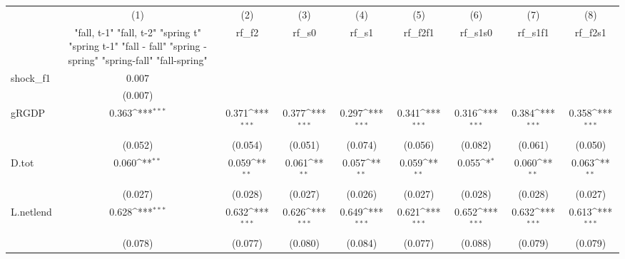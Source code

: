 {
\def\sym#1{\ifmmode^{#1}\else\(^{#1}\)\fi}
\begin{tabular}{l*{8}{c}}
\toprule
            &\multicolumn{1}{c}{(1)}&\multicolumn{1}{c}{(2)}&\multicolumn{1}{c}{(3)}&\multicolumn{1}{c}{(4)}&\multicolumn{1}{c}{(5)}&\multicolumn{1}{c}{(6)}&\multicolumn{1}{c}{(7)}&\multicolumn{1}{c}{(8)}\\
            &\multicolumn{1}{c}{  "fall, t-1" "fall, t-2" "spring t" "spring t-1"  "fall - fall" "spring - spring" "spring-fall" "fall-spring" }&\multicolumn{1}{c}{rf\_f2}&\multicolumn{1}{c}{rf\_s0}&\multicolumn{1}{c}{rf\_s1}&\multicolumn{1}{c}{rf\_f2f1}&\multicolumn{1}{c}{rf\_s1s0}&\multicolumn{1}{c}{rf\_s1f1}&\multicolumn{1}{c}{rf\_f2s1}\\
\midrule
shock\_f1    &       0.007         &                     &                     &                     &                     &                     &                     &                     \\
            &     (0.007)         &                     &                     &                     &                     &                     &                     &                     \\
\addlinespace
gRGDP       &       0.363\sym{***}&       0.371\sym{***}&       0.377\sym{***}&       0.297\sym{***}&       0.341\sym{***}&       0.316\sym{***}&       0.384\sym{***}&       0.358\sym{***}\\
            &     (0.052)         &     (0.054)         &     (0.051)         &     (0.074)         &     (0.056)         &     (0.082)         &     (0.061)         &     (0.050)         \\
\addlinespace
D.tot       &       0.060\sym{**} &       0.059\sym{**} &       0.061\sym{**} &       0.057\sym{**} &       0.059\sym{**} &       0.055\sym{*}  &       0.060\sym{**} &       0.063\sym{**} \\
            &     (0.027)         &     (0.028)         &     (0.027)         &     (0.026)         &     (0.027)         &     (0.028)         &     (0.028)         &     (0.027)         \\
\addlinespace
L.netlend   &       0.628\sym{***}&       0.632\sym{***}&       0.626\sym{***}&       0.649\sym{***}&       0.621\sym{***}&       0.652\sym{***}&       0.632\sym{***}&       0.613\sym{***}\\
            &     (0.078)         &     (0.077)         &     (0.080)         &     (0.084)         &     (0.077)         &     (0.088)         &     (0.079)         &     (0.079)         \\

\end{tabular}}
